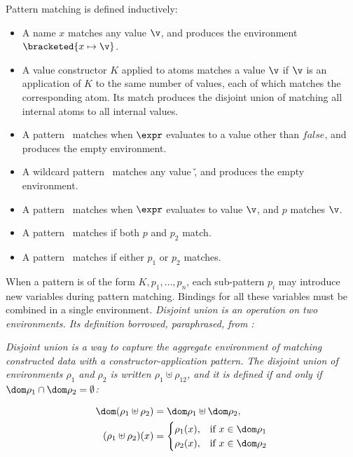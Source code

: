 \documentclass[manuscript,screen,review, 12pt, nonacm]{acmart}
\begin{document}
Pattern matching is defined inductively: 
\begin{itemize}
    \item A name $x$ matches any value $\v$, and produces the environment 
    $\bracketed{x \mapsto \v}$. 
    \item A value constructor $K$ applied to atoms  matches 
    a value $\v$ if $\v$ is an application of $K$ to the same number of values,
    each of which matches the corresponding atom. Its match produces 
    the disjoint union of matching all internal atoms to all internal values. 
    \item A pattern \whenexpr\ matches when $\expr$ evaluates to a value other than 
    $\mathit{false}$, and produces the empty environment. 
    \item A wildcard pattern \wildcard\ matches any value \v, and produces the
    empty environment. 
    \item A pattern \parrowe\ matches when $\expr$ evaluates to 
          value $\v$, and $p$ matches $\v$. 
    \item A pattern \pcommap\ matches if both $p$ and $p_{2}$ match.
    \item A pattern \porp\ matches if either $p_{1}$ or $p_{2}$
    matches. 
\end{itemize}

When a pattern is of the form $K, p_{1}, \dots, p_{n}$, each sub-pattern $p_{i}$
may introduce new variables during pattern matching. Bindings for all these
variables must be combined in a single environment. \it{Disjoint union} is an
operation on two environments. Its definition borrowed, paraphrased, from
\citet{bpc}: 

\it{Disjoint union} is a way to capture the aggregate environment of matching
constructed data with a constructor-application pattern. The disjoint union of
environments $\rho_{1}$ and $\rho_{2}$ is written $\rho_{1} \uplus \rho_{12}$,
and it is defined if and only if $\dom \rho_{1} \cap \dom \rho_{2} = \emptyset$:

\begin{align*}
  \dom(\rho_{1} \uplus \rho_{2}) &= \dom \rho_{1} \uplus \dom \rho_{2}, \\
    (\rho_{1} \uplus \rho_{2})(x) &= 
  \begin{cases}
    \rho_{1}(x), & \text{if } x \in \dom  \rho_{1} \\
    \rho_{2}(x), & \text{if } x \in \dom \rho_{2} \\
\end{cases}
\end{align*}
\end{document}
